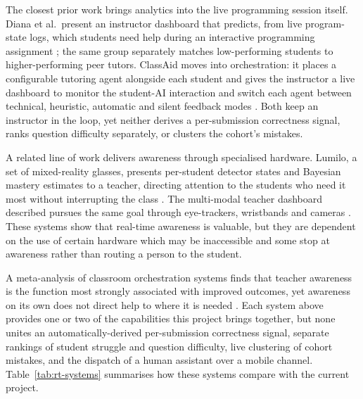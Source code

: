 The closest prior work brings analytics into the live programming session itself. Diana et al.\ present an instructor dashboard that predicts, from live program-state logs, which students need help during an interactive programming assignment \cite{dianaInstructorDashboardRealtime2017}; the same group separately matches low-performing students to higher-performing peer tutors. 
ClassAid moves into orchestration: it places a configurable tutoring agent alongside each student and gives the instructor a live dashboard to monitor the student-AI interaction and switch each agent between technical, heuristic, automatic and silent feedback modes \cite{zhangClassAidRealtimeInstructorAIStudent2026}. Both keep an instructor in the loop, yet neither derives a per-submission correctness signal, ranks question difficulty separately, or clusters the cohort's mistakes.

A related line of work delivers awareness through specialised hardware. 
Lumilo, a set of mixed-reality glasses, presents per-student detector states and Bayesian mastery estimates to a teacher, directing attention to the students who need it most without interrupting the class \cite{holsteinIntelligentTutorsTeachers2017a, holsteinStudentLearningBenefits2018}. The multi-modal teacher dashboard described pursues the same goal through eye-trackers, wristbands and cameras \cite{leecultura_2023_multimodal}. These systems show that real-time awareness is valuable, but they are dependent on the use of certain hardware which may be inaccessible and some stop at awareness rather than routing a person to the student.

A meta-analysis of classroom orchestration systems finds that teacher awareness is the function most strongly associated with improved outcomes, yet awareness on its own does not direct help to where it is needed \cite{fengEffectivenessFunctionsClassroom2023}. Each system above provides one or two of the capabilities this project brings together, but none unites an automatically-derived per-submission correctness signal, separate rankings of student struggle and question difficulty, live clustering of cohort mistakes, and the dispatch of a human assistant over a mobile channel. Table~\ref{tab:rt-systems} summarises how these systems compare with the current project.

